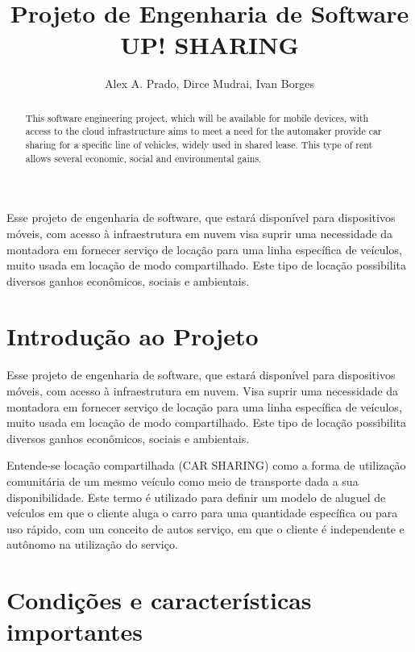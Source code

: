 \documentclass[12pt]{article}
\title{Projeto de Engenharia de Software \\ UP! SHARING}
\author{Alex A. Prado\inst{1}, Dirce Mudrai\inst{1}, Ivan Borges\inst{1} \email{alex.azprado@gmail.com, dirce.mudrai@icloud.com,
  ivangb@gmail.com}}
\begin{document}
 

\maketitle

\begin{abstract}

This software engineering project, which will be available for mobile devices, with access to the cloud infrastructure aims to meet a need for the automaker provide car sharing for a specific line of vehicles, widely used in shared lease. This type of rent allows several economic, social and environmental gains.
 
\end{abstract}
     
\begin{resumo} 

Esse projeto de engenharia de software, que estará disponível para dispositivos móveis, com acesso à infraestrutura em nuvem visa suprir uma necessidade da montadora em fornecer serviço de locação para uma linha específica de veículos, muito usada em locação de modo compartilhado.  Este tipo de locação possibilita diversos ganhos econômicos, sociais e ambientais. 

\end{resumo}


\section{Introdução ao Projeto}

Esse projeto de engenharia de software, que estará disponível para dispositivos móveis, com acesso à infraestrutura em nuvem. Visa suprir uma necessidade da montadora em fornecer serviço de locação para uma linha específica de veículos, muito usada em locação de modo compartilhado. Este tipo de locação possibilita diversos ganhos econômicos, sociais e ambientais.

Entende-se locação compartilhada (CAR SHARING) como a forma de utilização comunitária de um mesmo veículo como meio de transporte dada a sua disponibilidade. Este termo é utilizado para definir um modelo de aluguel de veículos em que o cliente aluga o carro para uma quantidade específica ou para uso rápido, com um conceito de autos serviço, em que o cliente é independente e autônomo na utilização do serviço.

\section{Condições e características importantes}
\end{document}
